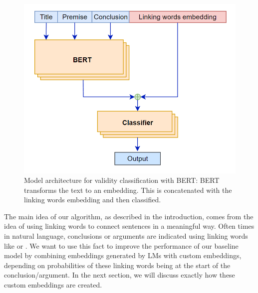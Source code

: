 \begin{figure}[h]
  \centering
  \includegraphics[scale=0.6]{fig/model_diag1.png}
  \caption{Model architecture for validity classification with BERT: BERT transforms the text to an embedding. This is concatenated with the linking words embedding and then classified.}%
  \label{fig:model-architecture1}
\end{figure}

The main idea of our algorithm, as described in the introduction, comes from the idea of using linking words to connect sentences in a meaningful way. Often times in natural language, conclusions or arguments are indicated using linking words like  or . We want to use this fact to improve the performance of our baseline model by combining embeddings generated by LMs with custom embeddings, depending on probabilities of these linking words being at the start of the conclusion/argument. In the next section, we will discuss exactly how these custom embeddings are created.

